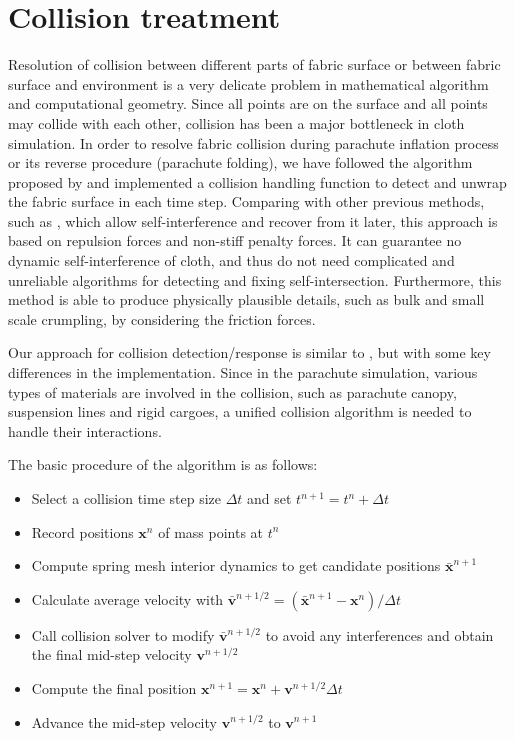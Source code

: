 \section{Collision treatment}
Resolution of collision between different parts of
fabric surface or between fabric surface and environment is a very delicate
problem in mathematical algorithm and computational geometry. Since all points 
are on the surface and all points may collide with each other, collision has been 
a major bottleneck in cloth simulation. In order to resolve fabric collision during parachute inflation process or its reverse procedure (parachute folding), we have followed the algorithm proposed by \cite{Bridson02} and implemented a collision handling function to detect and unwrap the fabric surface in each time step. Comparing with other previous methods, such as \cite{Provot1997, Volino1995}, which allow self-interference and recover from it later, this approach is based on repulsion forces and non-stiff penalty forces. It can guarantee no dynamic self-interference of cloth, and thus do not need complicated and unreliable algorithms for detecting and fixing self-intersection. Furthermore, this method is able to produce physically plausible details, such as bulk and small scale crumpling, by considering the friction forces.

Our approach for collision detection/response is similar to \cite{Bridson02}, but with some key differences in the implementation. Since in the parachute simulation, various types of materials are involved in the collision, such as parachute canopy, suspension lines and rigid cargoes, a unified collision algorithm is needed to handle their interactions. 
 
The basic procedure of the algorithm is as follows:
\begin{itemize}
\item Select a collision time step size $\Delta t$ and set $t^{n+1}=t^{n}+\Delta t$
\item Record positions $\mathbf{x}^n$ of mass points at $t^n$
\item Compute spring mesh interior dynamics to get candidate positions
$\bar{\mathbf{x}}^{n+1}$
\item Calculate average velocity with
$\bar{\mathbf{v}}^{n+1/2} = (\bar{\mathbf{x}}^{n+1}-\mathbf{x}^n)/\Delta t$
\item Call collision solver to modify $\bar{\mathbf{v}}^{n+1/2}$ to avoid any interferences and obtain the final mid-step velocity $\mathbf{v}^{n+1/2}$
\item Compute the final position
$\mathbf{x}^{n+1} = \mathbf{x}^n+\mathbf{v}^{n+1/2}\Delta t$
\item Advance the mid-step velocity $\mathbf{v}^{n+1/2}$ to $\mathbf{v}^{n+1}$ \end{itemize}

